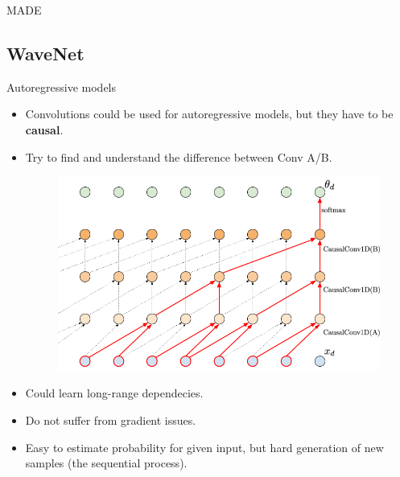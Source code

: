 \documentclass{beamer}
\begin{document}
\begin{frame}{MADE}
\begin{minipage}[t]{0.41\columnwidth}
\begin{figure}
		\end{figure}
	\end{minipage}
\end{frame}
\subsection{WaveNet}
\begin{frame}{Autoregressive models}
	\begin{itemize}
		\item Convolutions could be used for autoregressive models, but they have to be \textbf{causal}. \\
		\item Try to find and understand the difference between Conv A/B.
		\begin{figure}
			\centering
			\includegraphics[width=0.7\linewidth]{figs/sequential_CNN}
		\end{figure}
		\item Could learn long-range dependecies.
		\item Do not suffer from gradient issues.
		\item Easy to estimate probability for given input, but hard generation of new samples (the sequential process).
	\end{itemize}
\end{frame}
\end{document}
